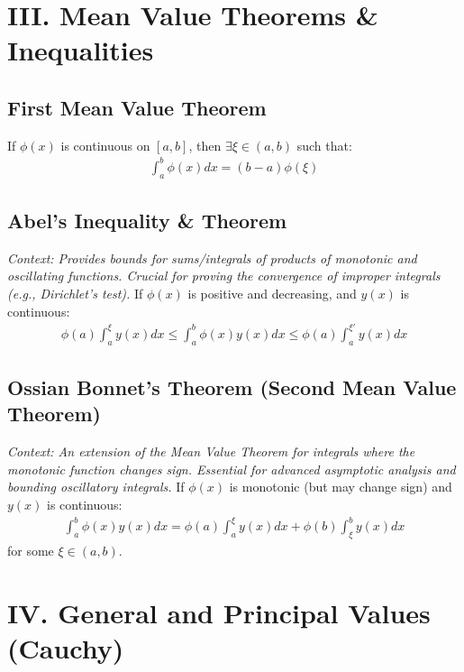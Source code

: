 \documentclass[11pt, a4paper]{article}
\begin{document}
\vspace{0.3cm}

\section*{\color{primary} III. Mean Value Theorems \& Inequalities}

\subsection*{\color{secondary} First Mean Value Theorem}
If $\phi(x)$ is continuous on $[a,b]$, then $\exists \xi \in (a,b)$ such that:
\begin{align*}
    \int_a^b \phi(x) dx = (b-a)\phi(\xi)
\end{align*}

\subsection*{\color{secondary} Abel's Inequality \& Theorem}
\textit{\small Context: Provides bounds for sums/integrals of products of monotonic and oscillating functions. Crucial for proving the convergence of improper integrals (e.g., Dirichlet's test).}
If $\phi(x)$ is positive and decreasing, and $y(x)$ is continuous:
\begin{align*}
    \phi(a) \int_a^\xi y(x) dx \le \int_a^b \phi(x)y(x) dx \le \phi(a) \int_a^{\xi'} y(x) dx
\end{align*}

\subsection*{\color{secondary} Ossian Bonnet's Theorem (Second Mean Value Theorem)}
\textit{\small Context: An extension of the Mean Value Theorem for integrals where the monotonic function changes sign. Essential for advanced asymptotic analysis and bounding oscillatory integrals.}
If $\phi(x)$ is monotonic (but may change sign) and $y(x)$ is continuous:
\begin{align*}
    \int_a^b \phi(x)y(x) dx = \phi(a)\int_a^\xi y(x) dx + \phi(b)\int_\xi^b y(x) dx
\end{align*}
for some $\xi \in (a,b)$.

\section*{\color{primary} IV. General and Principal Values (Cauchy)}
\end{document}
